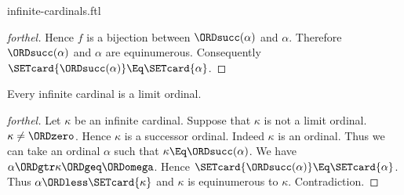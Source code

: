 \documentclass{stex}
\begin{document}
\begin{smodule}{infinite-cardinals.ftl}
\begin{proof}[forthel]
  Hence $f$ is a bijection between $\ORDsucc(\alpha)$ and $\alpha$.
  Therefore $\ORDsucc(\alpha)$ and $\alpha$ are equinumerous.
  Consequently $\SETcard{\ORDsucc(\alpha)} \Eq \SETcard{\alpha}$.
\end{proof}

\begin{proposition}[forthel]
  Every infinite cardinal is a limit ordinal.
\end{proposition}
\begin{proof}[forthel]
  Let $\kappa$ be an infinite cardinal.
  Suppose that $\kappa$ is not a limit ordinal.
  $\kappa \neq \ORDzero$.
  Hence $\kappa$ is a successor ordinal.
  Indeed $\kappa$ is an ordinal.
  Thus we can take an ordinal $\alpha$ such that $\kappa \Eq \ORDsucc(\alpha)$.
  We have $\alpha \ORDgtr \kappa \ORDgeq \ORDomega$.
  Hence $\SETcard{\ORDsucc(\alpha)} \Eq \SETcard{\alpha}$.
  Thus $\alpha \ORDless \SETcard{\kappa}$ and $\kappa$ is equinumerous to $\kappa$.
  Contradiction.
\end{proof}
\end{smodule}
\end{document}
